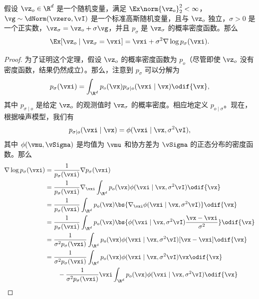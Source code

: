 \documentclass[../../book-main.tex]{subfiles}
\begin{document}
\begin{theorem}\label{thm:tweedie}
    假设 \(\vz_{o} \in \R^{d}\) 是一个随机变量，满足 \(\Ex\norm{\vz_{o}}_{2}^{2} < \infty\)，\(\vg \sim \dNorm(\vzero, \vI)\) 是一个标准高斯随机变量，且与 \(\vz_{o}\) 独立，\(\sigma > 0\) 是一个正实数，\(\vz_{\sigma} = \vz_{o} + \sigma \vg\)，并且 \(p_{\sigma}\) 是 \(\vz_{\sigma}\) 的概率密度函数。那么 
    \begin{equation}
        \Ex[\vz_{o} \mid \vz_{\sigma} = \vxi] = \vxi + \sigma^{2}\nabla \log p_{\sigma}(\vxi).
    \end{equation}
\end{theorem}
\begin{proof}
    为了证明这个定理，假设 \(\vz_{o}\) 的概率密度函数为 \(p_{o}\)（尽管即使 \(\vz_{o}\) 没有密度函数，结果仍然成立）。那么，注意到 \(p_{\sigma}\) 可以分解为 
    \begin{equation}
        p_{\sigma}(\vxi) = \int_{\R^{d}}p_{o}(\vx)p_{\sigma \mid o}(\vxi \mid \vx)\odif{\vx},
    \end{equation}
    其中 \(p_{\sigma \mid o}\) 是给定 \(\vz_{o}\) 的观测值时 \(\vz_{\sigma}\) 的概率密度。相应地定义 \(p_{o \mid \sigma}\)。现在，根据噪声模型，我们有 
    \begin{equation}
        p_{\sigma \mid o}(\vxi \mid \vx) = \phi(\vxi \mid \vx, \sigma^{2}\vI),
    \end{equation}
    其中 \(\phi(\vmu, \vSigma)\) 是均值为 \(\vmu\) 和协方差为 \(\vSigma\) 的正态分布的密度函数。那么
    \begin{align}
        \nabla \log p_{\sigma}(\vxi)
        &= \frac{1}{p_{\sigma}(\vxi)}\nabla p_{\sigma}(\vxi) \\ 
        &= \frac{1}{p_{\sigma}(\vxi)}\nabla_{\vxi}\int_{\R^{d}}p_{o}(\vx)\phi(\vxi \mid \vx, \sigma^{2}\vI)\odif{\vx} \\ 
        &= \frac{1}{p_{\sigma}(\vxi)}\int_{\R^{d}}p_{o}(\vx)\bs{\nabla_{\vxi}\phi(\vxi \mid \vx, \sigma^{2}\vI)}\odif{\vx} \\ 
        &= \frac{1}{p_{\sigma}(\vxi)}\int_{\R^{d}}p_{o}(\vx)\bs{\phi(\vxi \mid \vx, \sigma^{2}\vI)\frac{\vx - \vxi}{\sigma^{2}}}\odif{\vx} \\
        &= \frac{1}{\sigma^{2}p_{\sigma}(\vxi)}\int_{\R^{d}}p_{o}(\vx)\phi(\vxi \mid \vx, \sigma^{2}\vI)[\vx - \vxi]\odif{\vx} \\
        &= \frac{1}{\sigma^{2}p_{\sigma}(\vxi)}\int_{\R^{d}}p_{o}(\vx)\phi(\vxi \mid \vx, \sigma^{2}\vI)\vx\odif{\vx} \\ 
        &\qquad - \frac{1}{\sigma^{2}p_{\sigma}(\vxi)}\vxi\int_{\R^{d}}p_{o}(\vx)\phi(\vxi \mid \vx, \sigma^{2}\vI)\odif{\vx} \\

\end{align}
\end{proof}
\end{document}
